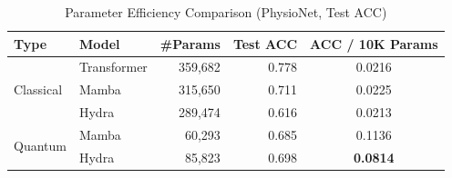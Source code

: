 \documentclass[conference]{IEEEtran}
\begin{document}
\begin{table}[t]
\centering
\caption{Parameter Efficiency Comparison (PhysioNet, Test ACC)}
\label{tab:param_efficiency}
\renewcommand{\arraystretch}{1.2}
\begin{tabular}{llrrc}
\toprule
Type & Model & \#Params & Test ACC & ACC / 10K Params \\
\midrule
\multirow{3}{*}{Classical}
 & Transformer & 359,682 & 0.778 & 0.0216 \\
 & Mamba       & 315,650 & 0.711 & 0.0225 \\
 & Hydra       & 289,474 & 0.616 & 0.0213 \\
\midrule
\multirow{2}{*}{Quantum}
 & Mamba       & 60,293  & 0.685 & 0.1136 \\
 & Hydra       & 85,823  & 0.698 & \textbf{0.0814} \\
\bottomrule
\end{tabular}
\end{table}


\end{document}
